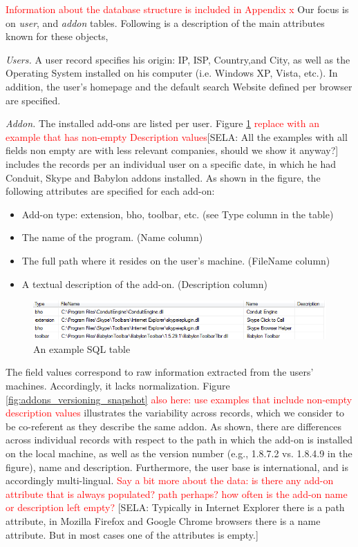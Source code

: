 \documentclass[11pt,oneside]{book}
\begin{document}
\textcolor{red}{Information about the database structure is included in Appendix x} Our focus is on {\it user}, and {\it addon} tables. Following is a description of the main attributes known for these objects,

{\it Users.} A user record specifies his origin: IP, ISP, Country,and City, as well as the Operating System installed on his computer (i.e. Windows XP, Vista, etc.). In addition, the user's homepage and the default search Website defined per browser are specified.

{\it Addon.} The installed add-ons are listed per user. Figure \ref{fig:db_addons_snapshot} \textcolor{red}{replace with an example that has non-empty Description values}[SELA: All the examples with all fields non empty are with less relevant companies, should we show it anyway?] includes the records per an individual user on a specific date, in which he had Conduit, Skype and Babylon addons installed. As shown in the figure, the following attributes are specified for each add-on:
\begin{itemize}
\item Add-on type: extension, bho, toolbar, etc. (see Type column in the table)
\item The name of the program. (Name column)
\item The full path where it resides on the user's machine. (FileName column)
\item A textual description of the add-on. (Description column)
\end{itemize}

\begin{figure}[t]
\centering
\begin{small}
\includegraphics[scale=.8,angle=0]{figures/db_addons_snapshot.png}
\end{small}
\caption{An example SQL table}
\label{fig:db_addons_snapshot}
\end{figure}

The field values correspond to raw information extracted from the users' machines. Accordingly, it lacks normalization. Figure \ref{fig:addons_versioning_snapshot} \textcolor{red}{also here: use examples that include non-empty description values} illustrates the variability across records, which we consider to be co-referent as they describe the same addon. As shown, there are differences across individual records with respect to the path in which the add-on is installed on the local machine, as well as the version number (e.g., 1.8.7.2 vs. 1.8.4.9 in the figure), name and description. Furthermore, the user base is international, and is accordingly multi-lingual.  \textcolor{red}{Say a bit more about the data: is there any add-on attribute that is always populated? path perhaps? how often is the add-on name or description left empty?}
[SELA: Typically in Internet Explorer there is a path attribute, in Mozilla Firefox and Google Chrome browsers there is a name attribute. But in most cases one of the attributes is empty.]
\end{document}
